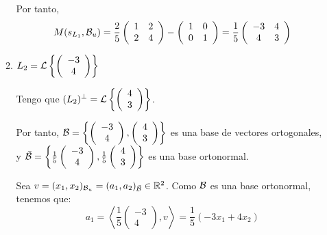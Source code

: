 \begin{ejercicio}
\begin{enumerate}
\begin{enumerate}
        Por tanto,
        \begin{equation*}
            M(s_{L_1},\mathcal{B}_u) = \frac{2}{5}\left(\begin{array}{cc}
                1 & 2 \\
                2 & 4
            \end{array}\right) - \left(\begin{array}{cc}
                1 & 0 \\
                0 & 1
            \end{array}\right)
            = \frac{1}{5}\left(\begin{array}{cc}
                -3 & 4 \\
                4 & 3
            \end{array}\right)
        \end{equation*}



        \item $L_2=\mathcal{L}\left\{\left(\begin{array}{c}
             -3 \\ 4
        \end{array}\right)\right\}$

        Tengo que $(L_2)^\perp=\mathcal{L}\left\{\left(\begin{array}{c}
             4 \\ 3
        \end{array}\right)\right\}$.

        Por tanto, $\mathcal{B}=\left\{\left(\begin{array}{c}
             -3 \\ 4
        \end{array}\right), \left(\begin{array}{c}
             4 \\ 3
        \end{array}\right)\right\}$ es una base de vectores ortogonales, y 
        $\bar{\mathcal{B}}=\left\{\frac{1}{5}\left(\begin{array}{c}
            -3 \\ 4
        \end{array}\right), \frac{1}{5}\left(\begin{array}{c}
             4 \\ 3
        \end{array}\right)\right\}$ es una base ortonormal.

        Sea $v=(x_1,x_2)_{\mathcal{B}_u}=(a_1,a_2)_{\bar{\mathcal{B}}}\in \mathbb{R}^2$. Como $\mathcal{B}$ es una base ortonormal, tenemos que:
        \begin{equation*}
            a_1=\left\langle \frac{1}{5}\left(\begin{array}{c}
             -3 \\ 4
        \end{array}\right), v\right\rangle = \frac{1}{5}(-3x_1+4x_2)
        \end{equation*}


\end{enumerate}
\end{enumerate}
\end{ejercicio}
